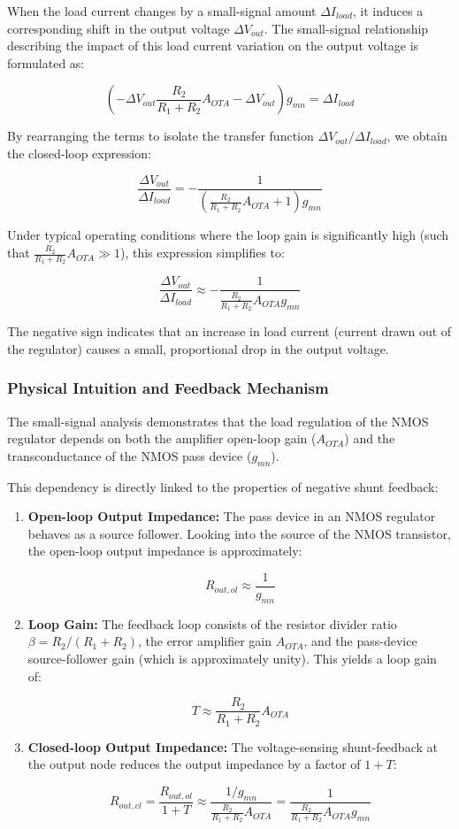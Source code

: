 \documentclass[
]{article}
\begin{document}
When the load current changes by a small-signal amount
\(\Delta I_{load}\), it induces a corresponding shift in the output
voltage \(\Delta V_{out}\). The small-signal relationship describing the
impact of this load current variation on the output voltage is
formulated as:

\[\left( -\Delta V_{out} \frac{R_2}{R_1 + R_2} A_{OTA} - \Delta V_{out} \right) g_{mn} = \Delta I_{load}\]

By rearranging the terms to isolate the transfer function
\(\Delta V_{out} / \Delta I_{load}\), we obtain the closed-loop
expression:

\[\frac{\Delta V_{out}}{\Delta I_{load}} = -\frac{1}{\left( \frac{R_2}{R_1 + R_2} A_{OTA} + 1 \right) g_{mn}}\]

Under typical operating conditions where the loop gain is significantly
high (such that \(\frac{R_2}{R_1 + R_2} A_{OTA} \gg 1\)), this
expression simplifies to:

\[\frac{\Delta V_{out}}{\Delta I_{load}} \approx -\frac{1}{\frac{R_2}{R_1 + R_2} A_{OTA} g_{mn}}\]

The negative sign indicates that an increase in load current (current
drawn out of the regulator) causes a small, proportional drop in the
output voltage.

\subsubsection{Physical Intuition and Feedback
Mechanism}\label{_physical_intuition_and_feedback_mechanism}

The small-signal analysis demonstrates that the load regulation of the
NMOS regulator depends on both the amplifier open-loop gain
(\(A_{OTA}\)) and the transconductance of the NMOS pass device
(\(g_{mn}\)).

This dependency is directly linked to the properties of negative shunt
feedback:

\begin{enumerate}
\def\labelenumi{\arabic{enumi}.}
\item
  \textbf{Open-loop Output Impedance:} The pass device in an NMOS
  regulator behaves as a source follower. Looking into the source of the
  NMOS transistor, the open-loop output impedance is approximately:

  \[R_{out, ol} \approx \frac{1}{g_{mn}}\]
\item
  \textbf{Loop Gain:} The feedback loop consists of the resistor divider
  ratio \(\beta = R_2 / (R_1 + R_2)\), the error amplifier gain
  \(A_{OTA}\), and the pass-device source-follower gain (which is
  approximately unity). This yields a loop gain of:

  \[T \approx \frac{R_2}{R_1 + R_2} A_{OTA}\]
\item
  \textbf{Closed-loop Output Impedance:} The voltage-sensing
  shunt-feedback at the output node reduces the output impedance by a
  factor of \(1 + T\):

  \[R_{out, cl} = \frac{R_{out, ol}}{1 + T} \approx \frac{1/g_{mn}}{\frac{R_2}{R_1 + R_2} A_{OTA}} = \frac{1}{\frac{R_2}{R_1 + R_2} A_{OTA} g_{mn}}\]
\end{enumerate}
\end{document}
